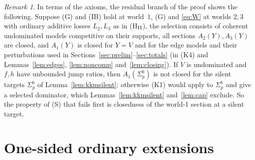 \documentclass[11pt]{article}
\theoremstyle{definition}\newtheorem{definition}[theorem]{Definition}
\theoremstyle{remark}\newtheorem{remark}[theorem]{Remark}
\begin{document}
\begin{remark}\label{rem:A1fails}
In terms of the axioms, the residual branch of the proof shows the following.
Suppose (G) and (IB) hold at world~$1$, (G) and \eqref{eq:W} at worlds $2,3$
with ordinary additive losses $L_2,L_3$ as in (H$_{\rm II}$),
the selection consists of coherent undominated models competitive on their
supports, all sections $A_2(Y),A_3(Y)$ are closed, and $A_1(Y)$ is closed for
$Y=V$ and for the edge models and their perturbations used in
Sections~\ref{sec:prelim}--\ref{sec:totals} (in (K4) and
Lemmas~\ref{lem:edges}, \ref{lem:noncomp} and~\ref{lem:closing}). If $V$ is
undominated and $f,h$ have unbounded jump ratios, then $A_1(\Sigma^b_p)$ is
not closed for the silent targets $\Sigma^b_p$ of Lemma~\ref{lem:kkmsilent}:
otherwise (K1) would apply to $\Sigma^b_p$ and give a selected dominator,
which Lemmas~\ref{lem:kkmsilent} and~\ref{lem:cap} exclude. So the property of
(S) that fails first is closedness of the world-1 section at a silent target.
\end{remark}

\section{One-sided ordinary extensions}\label{sec:onesided}
\end{document}
